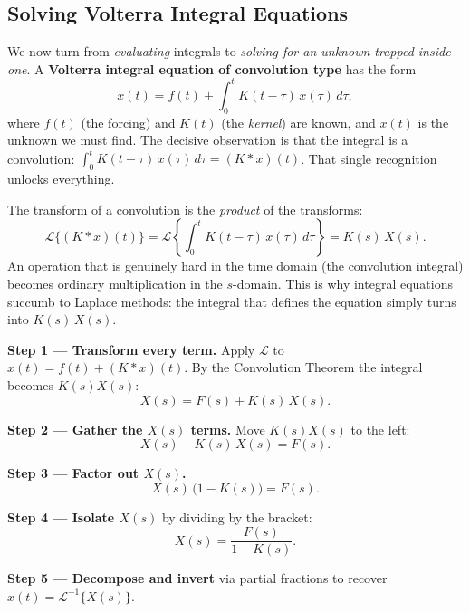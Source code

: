 \documentclass[11pt]{article}
\begin{document}
\subsection{Solving Volterra Integral Equations}

We now turn from \emph{evaluating} integrals to \emph{solving for an unknown trapped inside one}. A \textbf{Volterra integral equation of convolution type} has the form
\[ x(t) = f(t) + \int_0^t K(t-\tau)\,x(\tau)\,d\tau, \]
where $f(t)$ (the forcing) and $K(t)$ (the \emph{kernel}) are known, and $x(t)$ is the unknown we must find. The decisive observation is that the integral is a \textcolor{accentorange}{convolution}: $\int_0^t K(t-\tau)\,x(\tau)\,d\tau = (K * x)(t)$. That single recognition unlocks everything.

\begin{formulabox}
The transform of a convolution is the \emph{product} of the transforms:
\[ \mathcal{L}\{(K * x)(t)\} = \mathcal{L}\!\left\{\int_0^t K(t-\tau)\,x(\tau)\,d\tau\right\} = K(s)\,X(s). \]
An operation that is genuinely hard in the time domain (the convolution integral) becomes ordinary multiplication in the $s$-domain. This is why integral equations succumb to Laplace methods: the integral that defines the equation simply turns into $K(s)\,X(s)$.
\end{formulabox}

\begin{methodbox}
\textbf{Step 1 --- Transform every term.} Apply $\mathcal{L}$ to $x(t) = f(t) + (K*x)(t)$. By the Convolution Theorem the integral becomes $K(s)X(s)$:
\[ X(s) = F(s) + K(s)\,X(s). \]

\smallskip
\textbf{Step 2 --- Gather the $X(s)$ terms.} Move $K(s)X(s)$ to the left:
\[ X(s) - K(s)\,X(s) = F(s). \]

\smallskip
\textbf{Step 3 --- Factor out $X(s)$.}
\[ X(s)\,\big(1 - K(s)\big) = F(s). \]

\smallskip
\textbf{Step 4 --- Isolate $X(s)$} by dividing by the bracket:
\[ X(s) = \frac{F(s)}{1 - K(s)}. \]

\smallskip
\textbf{Step 5 --- Decompose and invert} via partial fractions to recover $x(t) = \mathcal{L}^{-1}\{X(s)\}$.
\end{methodbox}
\end{document}

